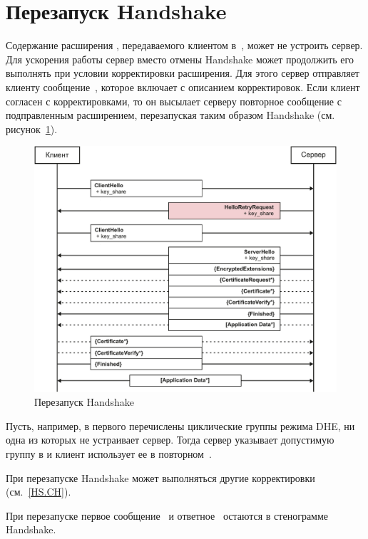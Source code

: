 \section{Перезапуск Handshake}\label{COMMON.Retry} 

Содержание расширения , передаваемого клиентом
в~, может не устроить сервер. Для ускорения работы
сервер вместо отмены Handshake может продолжить его выполнять при условии
корректировки расширения. Для этого сервер отправляет клиенту
сообщение~, которое включает
 с описанием корректировок.
%
Если клиент согласен с корректировками, то он высылает серверу повторное
сообщение  с подправленным расширением, перезапуская
таким образом Handshake (см. рисунок~\ref{Fig.COMMON.Retry}).

\begin{figure}[hbt]
\begin{center}
\includegraphics[width=15cm]{../figs/Retry}
\end{center}
\caption{Перезапуск Handshake}\label{Fig.COMMON.Retry}
\end{figure}

Пусть, например, в  первого
 перечислены циклические группы режима DHE, ни одна из
которых не устраивает сервер. Тогда сервер указывает допустимую группу в
 и клиент использует ее в
повторном~.

При перезапуске Handshake может выполняться другие корректировки
 (см.~\ref{HS.CH}).

При перезапуске первое сообщение~ и
ответное~ остаются в стенограмме Handshake.
